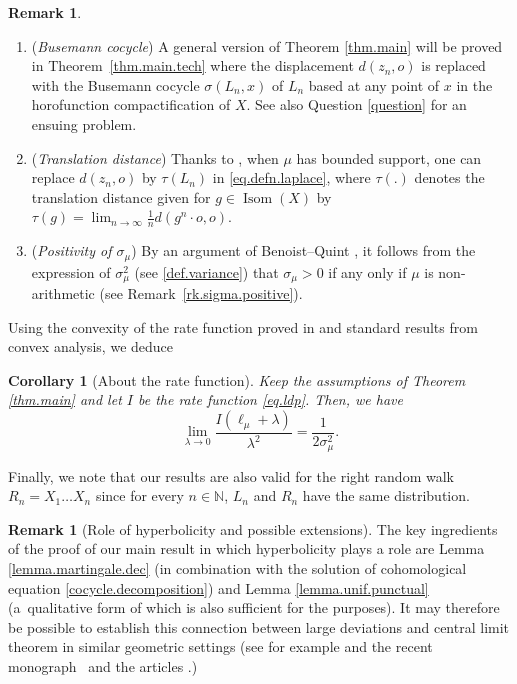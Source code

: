 \documentclass[10pt]{amsart}
\theoremstyle{plain}
\newtheorem{corollary}[theorem]{Corollary}
\theoremstyle{definition}
\newtheorem{remark}[theorem]{Remark}
\newcommand\N{\mathbb{N}}
\DeclareMathOperator\Isom{Isom}
\begin{document}
\skpt
\begin{remark}
\begin{enumerate}
\item
(\textit{Busemann cocycle}) A general version of Theorem \ref{thm.main} will be proved in Theorem~\ref{thm.main.tech} where the displacement $d(z_n, o)$ is replaced with the Busemann cocycle $\sigma(L_n, x)$ of $L_n$ based at any point of $x$ in the horofunction compactification of $X$. See also Question \ref{question} for an ensuing problem.

\item
(\textit{Translation distance}) Thanks to \cite[Th.\,1.3]{BMSS}, when $\mu$ has bounded support, one can replace $d(z_n,o)$ by $\tau(L_n)$ in \eqref{eq.defn.laplace}, where $\tau(.)$ denotes the translation distance given for $g \in \Isom(X)$ by $\tau(g)=\lim_{n \to \infty}\frac{1}{n}d(g^n \cdot o,o)$.

\item
(\textit{Positivity of $\sigma_\mu$}) By an argument of Benoist--Quint \cite{BQ.hyperbolic}, it follows from the expression of $\sigma_\mu^2$ (see \eqref{def.variance}) that $\sigma_\mu>0$ if any only if $\mu$ is non-arithmetic (see Remark~\ref{rk.sigma.positive}).
\end{enumerate}
\end{remark}

Using the convexity of the rate function proved in \cite{BMSS} and standard results from convex analysis, we deduce
\begin{corollary}[About the rate function]\label{corol.rate.function}
Keep the assumptions of Theorem \ref{thm.main} and let $I$ be the rate function \eqref{eq.ldp}. Then, we have\vspace*{-3pt}
\[
\lim_{\lambda \to 0}\frac{I(\ell_\mu+\lambda)}{\lambda^2}=\frac{1}{2\sigma_\mu^2}.
\]
\end{corollary}

Finally, we note that our results are also valid for the right random walk $R_n=X_1\ldots X_n$ since for every $n \in \N$, $L_n$ and $R_n$ have the same distribution.

\begin{remark}[Role of hyperbolicity and possible extensions]
The key ingredients of the proof of our main result in which hyperbolicity plays a role are Lemma \ref{lemma.martingale.dec} (in combination with the solution of cohomological equation \eqref{cocycle.decomposition}) and Lemma \ref{lemma.unif.punctual} (a~qualitative form of which is also sufficient for the purposes). It may therefore be possible to establish this connection between large deviations and central limit theorem in similar geometric settings (see for example \cite{horbez} and the recent monograph~\cite{choi} and the articles \cite{choi1,choi2}.)
\end{remark}
\end{document}

